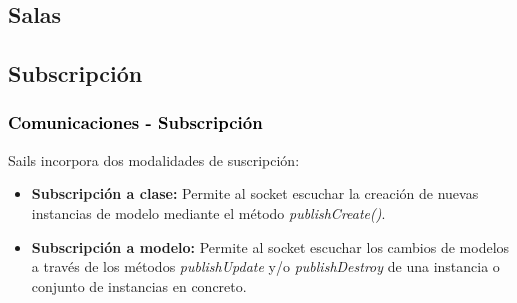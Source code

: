 \documentclass[xcolor=x11names,compress]{beamer}
\theoremstyle{cuadrado}
\begin{document}
{\subsection{Salas}



\subsection{Subscripción}

\begin{frame}[fragile]
\frametitle{\textcolor{black}{ Comunicaciones - Subscripción}}
Sails incorpora dos modalidades de suscripción:

\begin{itemize}
 \item \textbf{ Subscripción a clase:} Permite al socket escuchar la creación de nuevas instancias de modelo mediante el método \emph{publishCreate()}. 
 \item \textbf{Subscripción a modelo:} Permite al socket escuchar los cambios de modelos a través de los métodos \emph{publishUpdate} y/o \emph{publishDestroy} de una instancia o conjunto de instancias en concreto.
\end{itemize}

\begin{adjustwidth}{-2em}{-1em}


\end{adjustwidth}
\end{frame}}
\end{document}
